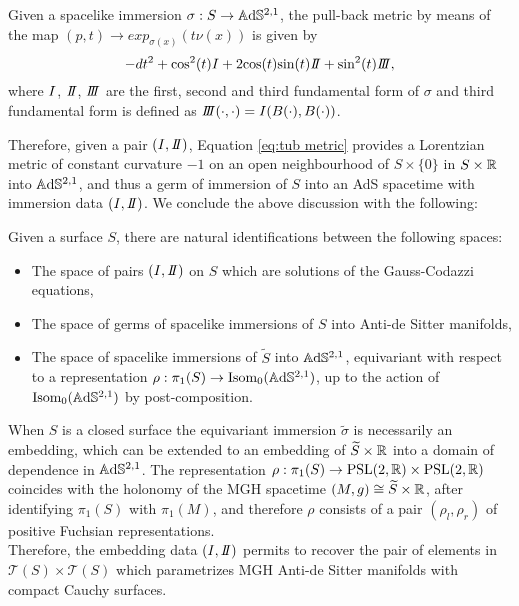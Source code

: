 \begin{corollary}
    Given a spacelike immersion $\sigma:S\to \mathbb{A}\mathrm{d}\mathbb{S}^{2,1}$, the pull-back metric by means of the map $(p,t) \to exp_{\sigma(x)}(t\nu(x))$ is given by
    \begin{equation}\label{eq:tub metric}
        -dt^2 + \text{cos}^2(t)\I + 2\text{cos}(t)\text{sin}(t)\II + \text{sin}^2(t)\III,
    \end{equation}
    where $I$, $\II$, $\III$ are the first, second and third fundamental form of $\sigma$ and third fundamental form is defined as $\III(\cdot,\cdot)=\I(B(\cdot),B(\cdot))$.
\end{corollary}
Therefore, given a pair $(\I,\II)$, Equation \ref{eq:tub metric} provides a Lorentzian metric of constant curvature $-1$ on an open neighbourhood of $S \times\{0\}$ in $S\times\mathbb{R}$ into $\mathbb{A}\mathrm{d}\mathbb{S}^{2,1}$, and thus a germ of immersion of $S$ into an AdS spacetime with immersion data $(\I,\II)$. We conclude the above discussion with the following:
\begin{proposition}\label{thm:immersion data classification}
    Given a surface $S$, there are natural identifications between the following spaces:
    \begin{itemize}
        \item The space of pairs $(\I,\II)$ on $S$ which are solutions of the Gauss-Codazzi equations,
        \item The space of germs of spacelike immersions of $S$ into Anti-de Sitter manifolds,
        \item The space of spacelike immersions of $\widetilde{S}$ into $\mathbb{A}\mathrm{d}\mathbb{S}^{2,1}$, equivariant with respect to a representation $\rho:\pi_1(S) \to \text{Isom}_0(\mathbb{A}\mathrm{d}\mathbb{S}^{2,1})$, up to the action of $\text{Isom}_0(\mathbb{A}\mathrm{d}\mathbb{S}^{2,1})$ by post-composition.
    \end{itemize}
\end{proposition}
When $S$ is a closed surface the equivariant immersion $\widetilde{\sigma}$ is necessarily an embedding, which can be extended to an embedding of $\widetilde{S}\times\mathbb{R}$ into a domain of dependence in $\mathbb{A}\mathrm{d}\mathbb{S}^{2,1}$. The representation $\rho:\pi_1(S) \to \text{PSL}(2,\mathbb{R}) \times \text{PSL}(2,\mathbb{R})$ coincides with the holonomy of the MGH spacetime $(M,g) \cong \widetilde{S}\times\mathbb{R}$, after identifying $\pi_1(S)$ with $\pi_1(M)$, and therefore $\rho$ consists of a pair $(\rho_l,\rho_r)$ of positive Fuchsian representations.\\
Therefore, the embedding data $(\I,\II)$ permits to recover the pair of elements in $\mathcal{T}(S)\times\mathcal{T}(S)$ which parametrizes MGH Anti-de Sitter manifolds with compact Cauchy surfaces.

